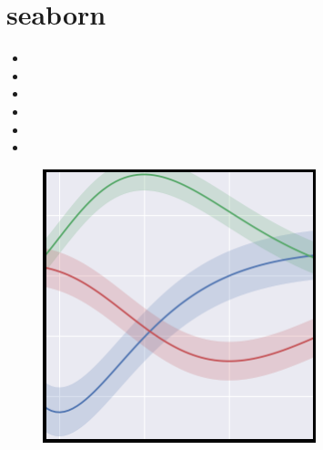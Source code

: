 \documentclass[]{article}
\begin{document}

\section{seaborn}


\begin{itemize}
	\item
	\item
	\item
	\item
	\item
	\item
\end{itemize}


\begin{figure}
\centering
\includegraphics[width=0.7\linewidth]{seaborn1}
\caption{}
\label{fig:seaborn1}
\end{figure}
\end{document}
